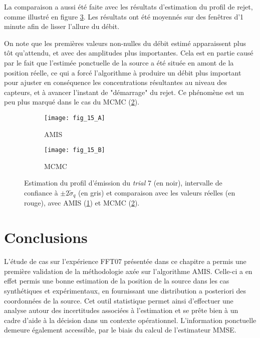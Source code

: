 La comparaison a aussi été faite avec les résultats d'estimation du profil de rejet, comme illustré en figure \ref{fig_15_AE}. Les résultats ont été moyennés sur des fenêtres d'1 minute afin de lisser l'allure du débit.

 On note que les premières valeurs non-nulles du débit estimé apparaissent plus tôt qu'attendu, et avec des amplitudes plus importantes. Cela est en partie causé par le fait que l'estimée ponctuelle de la source a été située  en amont de la position réelle, ce qui a forcé l'algorithme à produire un débit plus important pour ajuster en conséquence les concentrations résultantes au niveau des capteurs, et à avancer l'instant de "démarrage" du rejet. Ce phénomène est un peu plus marqué dans le cas du MCMC (\ref{fig_15_B}).

\begin{figure}[h!]
	\centering
	\begin{subfigure}[t]{0.5\textwidth}
		\centering
		\texttt{[image: fig\_15\_A]}
		\caption{AMIS}
		\label{fig_15_A}
	\end{subfigure}%
	\centering
	\begin{subfigure}[t]{0.5\textwidth}
		\centering
		\texttt{[image: fig\_15\_B]}
		\caption{MCMC}
		\label{fig_15_B}
	\end{subfigure}
	\caption{Estimation du profil d'émission du \textit{trial} 7 (en noir), intervalle de confiance à $\pm 2\widetilde{\sigma}_q$ (en gris) et comparaison avec les valeurs réelles (en rouge), avec AMIS (\ref{fig_15_A}) et MCMC (\ref{fig_15_B}).}
	\label{fig_15_AE} 
\end{figure}

\section{Conclusions}

L'étude de cas sur l'expérience FFT07 présentée dans ce chapitre a permis une première validation de la méthodologie axée sur l'algorithme AMIS. Celle-ci a en effet permis une bonne estimation de la position de la source dans les cas synthétiques et expérimentaux,  en fournissant une distribution a posteriori des coordonnées de la source. Cet outil statistique permet ainsi d'effectuer une analyse autour des incertitudes associées à l'estimation et se prête bien à un cadre d'aide à la décision dans un contexte opérationnel. L'information ponctuelle demeure également accessible, par le biais du calcul de l'estimateur MMSE. \\

